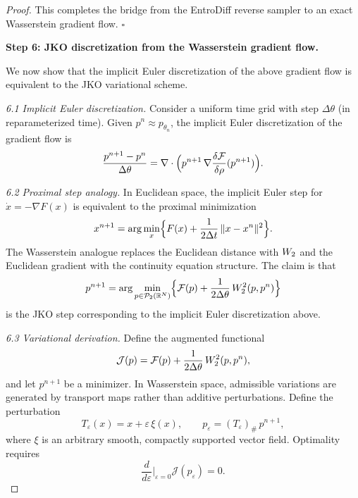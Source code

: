 \begin{proof}
This completes the bridge from the EntroDiff reverse sampler to an exact Wasserstein
gradient flow. $\square$

\medskip
\noindent\textbf{Step 6: JKO discretization from the Wasserstein gradient flow.}

We now show that the implicit Euler discretization of the above gradient flow is equivalent to
the JKO variational scheme.

\smallskip
\noindent\textit{6.1  Implicit Euler discretization.}
Consider a uniform time grid with step $\Delta\theta$ (in reparameterized time).
Given $p^{n} \approx p_{\theta_{n}}$, the implicit Euler discretization of the gradient flow is
\begin{equation}
\label{eq:implicit-euler}
\frac{p^{n+1} - p^{n}}{\Delta\theta}
  = \nabla \cdot \Bigl( p^{n+1}\,\nabla\frac{\delta\mathcal{F}}{\delta\rho}(p^{n+1}) \Bigr).
\end{equation}

\smallskip
\noindent\textit{6.2  Proximal step analogy.}
In Euclidean space, the implicit Euler step for $\dot x = -\nabla F(x)$ is equivalent to the
proximal minimization
\begin{equation}
x^{n+1} = \arg\min_{x} \Bigl\{ F(x) + \frac{1}{2\Delta t}\,\|x - x^{n}\|^{2} \Bigr\}.
\end{equation}
The Wasserstein analogue replaces the Euclidean distance with $W_{2}$ and the Euclidean
gradient with the continuity equation structure.
The claim is that
\begin{equation}
\label{eq:jko-claim}
p^{n+1}
  = \arg\min_{p \in \mathcal{P}_{2}(\mathbb{R}^{N})}
    \Bigl\{ \mathcal{F}(p) + \frac{1}{2\Delta\theta}\,W_{2}^{2}(p, p^{n}) \Bigr\}
\end{equation}
is the JKO step corresponding to the implicit Euler discretization above.

\smallskip
\noindent\textit{6.3  Variational derivation.}
Define the augmented functional
\begin{equation}
\mathcal{J}(p) = \mathcal{F}(p) + \frac{1}{2\Delta\theta}\,W_{2}^{2}(p, p^{n}),
\end{equation}
and let $p^{n+1}$ be a minimizer.
In Wasserstein space, admissible variations are generated by transport maps rather than
additive perturbations.
Define the perturbation
\begin{equation}
T_{\varepsilon}(x) = x + \varepsilon\,\xi(x), \qquad
p_{\varepsilon} = (T_{\varepsilon})_{\#}\,p^{n+1},
\end{equation}
where $\xi$ is an arbitrary smooth, compactly supported vector field.
Optimality requires
\begin{equation}
\frac{d}{d\varepsilon}\Big|_{\varepsilon=0} \mathcal{J}(p_{\varepsilon}) = 0.
\end{equation}


\end{proof}

